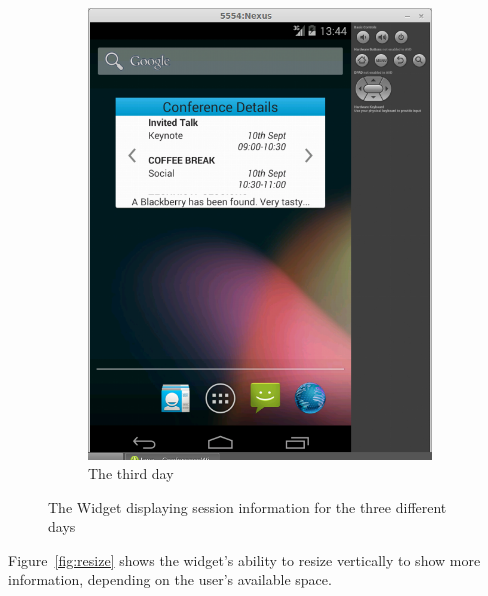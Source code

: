 \documentclass[11pt, a4paper]{article}
\begin{document}
\begin{figure}[h]
\begin{subfigure}[b]{0.3\textwidth}
\includegraphics[width=\textwidth]{img/running-day-3.png}
\caption{The third day}
\end{subfigure}
\caption{The Widget displaying session information for the three different 
         days}
\label{fig:days}
\end{figure}

Figure~\ref{fig:resize} shows the widget's ability to resize vertically to show
more information, depending on the user's available space.
\end{document}
